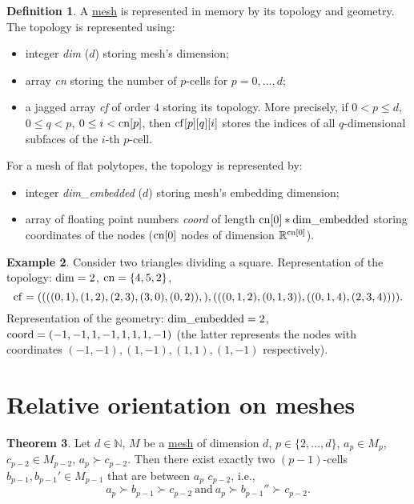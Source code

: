 \documentclass[fleqn]{article}
\theoremstyle{definition}
\newtheorem{theorem}{Theorem}[section]
\newtheorem{definition}[theorem]{Definition}
\newtheorem{example}[theorem]{Example}
\newcommand{\N}{\mathbb{N}}
\newcommand{\R}{\mathbb{R}}
\begin{document}
\begin{definition}
  A \hyperref[idec:mesh:definition]{mesh}
  is represented in memory by its topology and geometry.
  The topology is represented using:
  \begin{itemize}
    \item
      integer \emph{dim} ($d$) storing mesh's dimension;
    \item
      array \emph{cn} storing the number of $p$-cells for $p = 0, ..., d$; 
    \item
      a jagged array \emph{cf} of order $4$ storing its topology.
      More precisely, if $0 < p \leq d$, $0 \leq q < p$,
      $0 \leq i < {\rm cn}[p]$, then ${\rm cf}[p][q][i]$ stores the indices of
      all $q$-dimensional subfaces of the $i$-th $p$-cell.
  \end{itemize}
  For a mesh of flat polytopes, the topology is represented by:
  \begin{itemize}
    \item
      integer \emph{dim\_embedded} ($d$) storing mesh's embedding dimension;
    \item
      array of floating point numbers \emph{coord} of length
      ${\rm cn}[0] * {\rm dim\_embedded}$ storing coordinates of the nodes
      (${\rm cn}[0]$ nodes of dimension $\R^{{\rm cn}[0]}$).
  \end{itemize}
\end{definition}

\begin{example}
  Consider two triangles dividing a square.
  Representation of the topology: ${\rm dim} = 2$, ${\rm cn} = \{4, 5, 2\}$,
  \begin{equation}
    {\rm cf} =
    (
      (
        ((0, 1), (1, 2), (2, 3), (3, 0), (0, 2)),
      ),
      (
        ((0, 1, 2), (0, 1, 3)),
        ((0, 1, 4), (2, 3, 4))
      )
    ).
  \end{equation}
  Representation of the geometry: ${\rm dim\_embedded} = 2$,
  ${\rm coord} = (-1, -1, 1, -1, 1, 1, 1, -1)$
  (the latter represents the nodes with coordinates
  $(-1, -1), (1, -1), (1, 1), (1, -1)$ respectively).
\end{example}

\section{Relative orientation on meshes}

\begin{theorem}
  Let
    $d \in \N$,
    $M$ be a \hyperref[idec:mesh:definition]{mesh} of dimension $d$,
    $p \in \{2, ..., d\}$,
    $a_p \in M_p$,
    $c_{p - 2} \in M_{p - 2}$,
    $a_p \succ c_{p - 2}$.
  Then there exist exactly two $(p - 1)$-cells
  $b_{p - 1}, b_{p - 1}' \in M_{p - 1}$
  that are between $a_p$ $c_{p - 2}$, i.e.,
  \begin{equation}
    a_p \succ b_{p - 1} \succ c_{p - 2}\ \text{and}\
    a_p \succ b_{p - 1}'' \succ c_{p - 2}.
  \end{equation}
\end{theorem}
\end{document}
